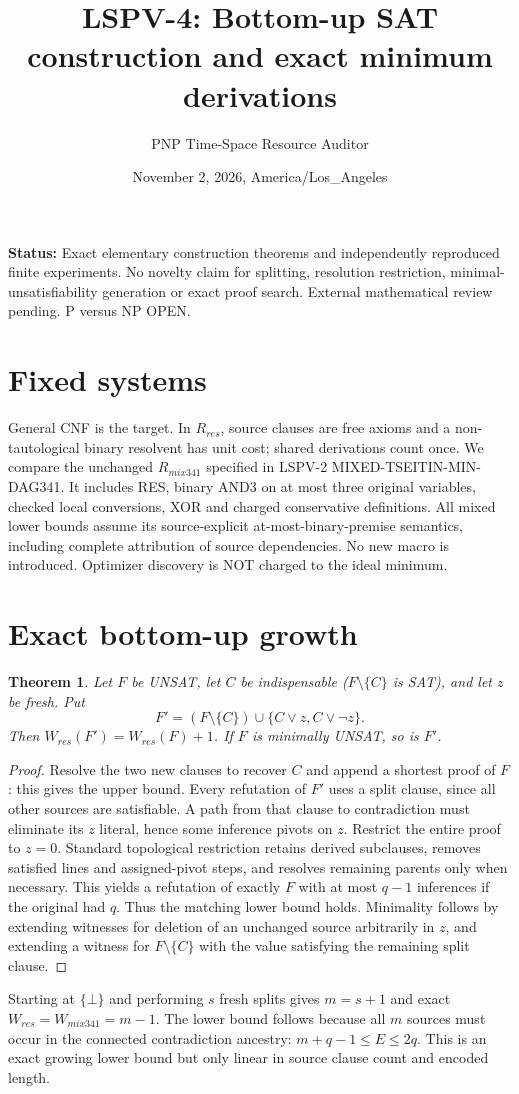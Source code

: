 \documentclass[11pt]{article}
\title{LSPV-4: Bottom-up SAT construction and exact minimum derivations}
\author{PNP Time-Space Resource Auditor}
\date{November 2, 2026, America/Los\_Angeles}
\newtheorem{theorem}{Theorem}
\begin{document}
\maketitle
\noindent\textbf{Status:} Exact elementary construction theorems and independently reproduced finite experiments. No novelty claim for splitting, resolution restriction, minimal-unsatisfiability generation or exact proof search. External mathematical review pending. P versus NP OPEN.

\section{Fixed systems}
General CNF is the target. In $R_{res}$, source clauses are free axioms and a non-tautological binary resolvent has unit cost; shared derivations count once. We compare the unchanged $R_{mix341}$ specified in LSPV-2 MIXED-TSEITIN-MIN-DAG341. It includes RES, binary AND3 on at most three original variables, checked local conversions, XOR and charged conservative definitions. All mixed lower bounds assume its source-explicit at-most-binary-premise semantics, including complete attribution of source dependencies. No new macro is introduced. Optimizer discovery is NOT charged to the ideal minimum.

\section{Exact bottom-up growth}
\begin{theorem}
Let $F$ be UNSAT, let $C$ be indispensable ($F\setminus\{C\}$ is SAT), and let $z$ be fresh. Put
\[
F'=(F\setminus\{C\})\cup\{C\vee z,C\vee\neg z\}.
\]
Then $W_{res}(F')=W_{res}(F)+1$. If $F$ is minimally UNSAT, so is $F'$.
\end{theorem}
\begin{proof}
Resolve the two new clauses to recover $C$ and append a shortest proof of $F$: this gives the upper bound. Every refutation of $F'$ uses a split clause, since all other sources are satisfiable. A path from that clause to contradiction must eliminate its $z$ literal, hence some inference pivots on $z$. Restrict the entire proof to $z=0$. Standard topological restriction retains derived subclauses, removes satisfied lines and assigned-pivot steps, and resolves remaining parents only when necessary. This yields a refutation of exactly $F$ with at most $q-1$ inferences if the original had $q$. Thus the matching lower bound holds. Minimality follows by extending witnesses for deletion of an unchanged source arbitrarily in $z$, and extending a witness for $F\setminus\{C\}$ with the value satisfying the remaining split clause.
\end{proof}
Starting at $\{\bot\}$ and performing $s$ fresh splits gives $m=s+1$ and exact $W_{res}=W_{mix341}=m-1$. The lower bound follows because all $m$ sources must occur in the connected contradiction ancestry: $m+q-1\le E\le2q$. This is an exact growing lower bound but only linear in source clause count and encoded length.
\end{document}
